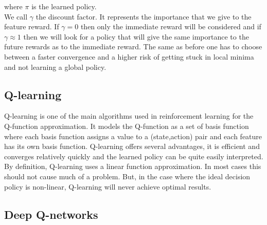 where $\pi$ is the learned policy.\\
We call $\gamma$ the discount factor. It represents the importance that we give to the feature reward. If $\gamma = 0$ then only the immediate reward will be considered and if $\gamma \approx 1$ then we will look for a policy that will give the same importance to the future rewards as to the immediate reward. The same as before one has to choose between a faster convergence and a higher risk of getting stuck in local minima and not learning a global policy.

 
\subsection{Q-learning}
Q-learning\cite{watkins1992q} is one of the main algorithms used in reinforcement learning for the Q-function approximation. It models the Q-function as a set of basis function where each basis function assigns a value to a (state,action) pair and each feature has its own basis function. Q-learning offers several advantages, it is efficient and converges relatively quickly and the learned policy can be quite easily interpreted. By definition, Q-learning uses a linear function approximation. In most cases this should not cause much of a problem. But, in the case where the ideal decision policy is non-linear, Q-learning will never achieve optimal results.
\subsection{Deep Q-networks}

